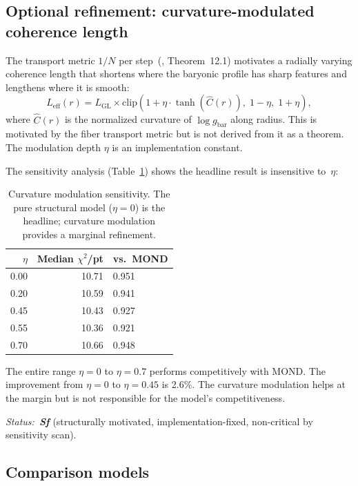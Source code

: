 \documentclass[11pt,a4paper]{article}
\begin{document}
\subsection{Optional refinement: curvature-modulated coherence length}
\label{sec:curvature}

The transport metric $1/N$ per step~(\cite{Wells2026a}, Theorem~12.1) motivates a radially varying coherence length that shortens where the baryonic profile has sharp features and lengthens where it is smooth:
\begin{equation}
\label{eq:Leff}
L_{\mathrm{eff}}(r) = L_{\mathrm{GL}} \times \mathrm{clip}\!\left(1 + \eta \cdot \tanh\!\left(\hat{C}(r)\right),\; 1 - \eta,\; 1 + \eta\right),
\end{equation}
where $\hat{C}(r)$ is the normalized curvature of $\log g_{\mathrm{bar}}$ along radius.
This is motivated by the fiber transport metric but is not derived from it as a theorem.
The modulation depth $\eta$ is an implementation constant.

The sensitivity analysis (Table~\ref{tab:eta}) shows the headline result is insensitive to~$\eta$:

\begin{table}[h]
\centering
\caption{Curvature modulation sensitivity. The pure structural model ($\eta = 0$) is the headline; curvature modulation provides a marginal refinement.}
\label{tab:eta}
\begin{tabular}{rrl}
\toprule
$\eta$ & Median $\chi^2$/pt & vs.\ MOND \\
\midrule
0.00 & 10.71 & 0.951 \\
0.20 & 10.59 & 0.941 \\
0.45 & 10.43 & 0.927 \\
0.55 & 10.36 & 0.921 \\
0.70 & 10.66 & 0.948 \\
\bottomrule
\end{tabular}
\end{table}

The entire range $\eta = 0$ to $\eta = 0.7$ performs competitively with MOND.
The improvement from $\eta = 0$ to $\eta = 0.45$ is 2.6\%.
The curvature modulation helps at the margin but is not responsible for the model's competitiveness.

\textit{Status:~\textbf{S\!f}} (structurally motivated, implementation-fixed, non-critical by sensitivity scan).

\subsection{Comparison models}
\label{sec:comparison-models}
\end{document}
